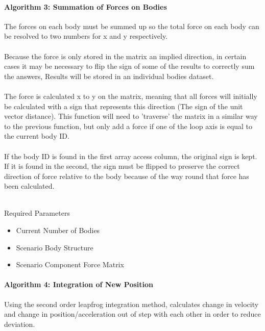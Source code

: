 \paragraph{Algorithm 3: Summation of Forces on Bodies}
The forces on each body must be summed up so the total force on each body can be resolved to two numbers for x and y respectively.

\paragraph{}
Because the force is only stored in the matrix an implied direction, in certain cases it may be necessary to flip the sign of some of the results to correctly sum the answers, Results will be stored in an individual bodies dataset.

\paragraph{}
The force is calculated x to y on the matrix, meaning that all forces will initially be calculated with a sign that represents this direction (The sign of the unit vector distance).
This function will need to 'traverse' the matrix in a similar way to the previous function, but only add a force if one of the loop axis is equal to the current body ID.

\paragraph{} If the body ID is found in the first array access column, the original sign is kept. If it is found in the second, the sign must be flipped to preserve the correct direction of force relative to the body because of the way round that force has been calculated. \\\

Required Parameters
\begin{itemize}
\item Current Number of Bodies
\item Scenario Body Structure
\item Scenario Component Force Matrix
\end{itemize}

\pagebreak
\paragraph{Algorithm 4: Integration of New Position}
Using the second order leapfrog integration method, calculates change in velocity and change in position/acceleration out of step with each other in order to reduce deviation.

